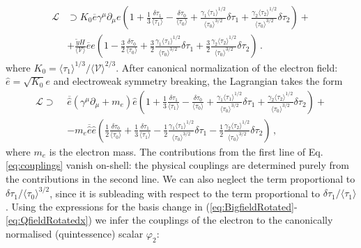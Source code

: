 \documentclass[11pt,a4paper]{article}
\newcommand{\V}{\mathcal{V}}
\begin{document}
\begin{align}
\mathcal{L} &\supset K_0 \overline{e} \gamma^\mu \partial_\mu e \left(1 + \frac{1}{3} \frac{\delta \tau_1}{\langle \tau_1 \rangle} - \frac{\delta \tau_0}{\langle \tau_0 \rangle} + \frac{\gamma_1 \langle \tau_1 \rangle^{1/2}}{\langle \tau_0 \rangle^{3/2}} \delta \tau_1 + \frac{\gamma_2 \langle \tau_2 \rangle^{1/2}}{\langle \tau_0 \rangle^{3/2}} \delta \tau_2\right) + \\
&+ \frac{\tilde{y} H}{\langle \V \rangle} \overline{e} e \left(1 - \frac{3}{2} \frac{\delta \tau_0}{\langle \tau_0 \rangle} + \frac{3}{2} \frac{\gamma_1 \langle \tau_1 \rangle^{1/2}}{\langle \tau_0 \rangle^{3/2}} \delta \tau_1 +  \frac{3}{2} \frac{\gamma_2 \langle \tau_2 \rangle^{1/2}}{\langle \tau_0 \rangle^{3/2}} \delta \tau_2\right) \,.
\end{align}
where $K_0 = \langle \tau_1 \rangle^{1/3}/\langle \V \rangle^{2/3}$. After canonical normalization of the electron field: $\hat{e} = \sqrt{K_0} e$ and electroweak symmetry breaking, the Lagrangian takes the form
\begin{align}
\mathcal{L} \supset \,\, & \overline{\hat{e}} \left(\gamma^\mu \partial_\mu + m_e\right) \hat{e} \left(1 +\frac{1}{3} \frac{\delta \tau_1}{\langle \tau_1 \rangle} - \frac{\delta \tau_0}{\langle \tau_0 \rangle} + \frac{\gamma_1 \langle \tau_1 \rangle^{1/2}}{\langle \tau_0 \rangle^{3/2}} \delta \tau_1 + \frac{\gamma_2 \langle \tau_2 \rangle^{1/2}}{\langle \tau_0 \rangle^{3/2}} \delta \tau_2\right) + \nonumber \\
\label{eq:couplings}
&- m_e \overline{\hat{e}} \hat{e} \left(\frac{1}{2} \frac{\delta \tau_0}{\langle \tau_0 \rangle} + \frac{1}{3} \frac{\delta \tau_1}{\langle \tau_1 \rangle} - \frac{1}{2} \frac{\gamma_1 \langle \tau_1 \rangle^{1/2}}{\langle \tau_0 \rangle^{3/2}} \delta \tau_1 - \frac{1}{2} \frac{\gamma_2 \langle \tau_2 \rangle^{1/2}}{\langle \tau_0 \rangle^{3/2}} \delta \tau_2\right) \,,
\end{align}
where $m_e$ is the electron mass. %
The contributions from the first line of Eq. \eqref{eq:couplings} vanish on-shell: the physical couplings are determined purely from the contributions in the second line. We can also neglect the term proportional to $\delta \tau_1/\langle \tau_0 \rangle^{3/2}$, since it is subleading with respect to the term proportional to $\delta\tau_1/\langle \tau_1\rangle$. Using the  expressions for the basis change in  (\ref{eq:BigfieldRotated}-\ref{eq:QfieldRotatedx}) we infer the couplings of the electron to the canonically normalised (quintessence) scalar $\varphi_2$:
\end{document}
